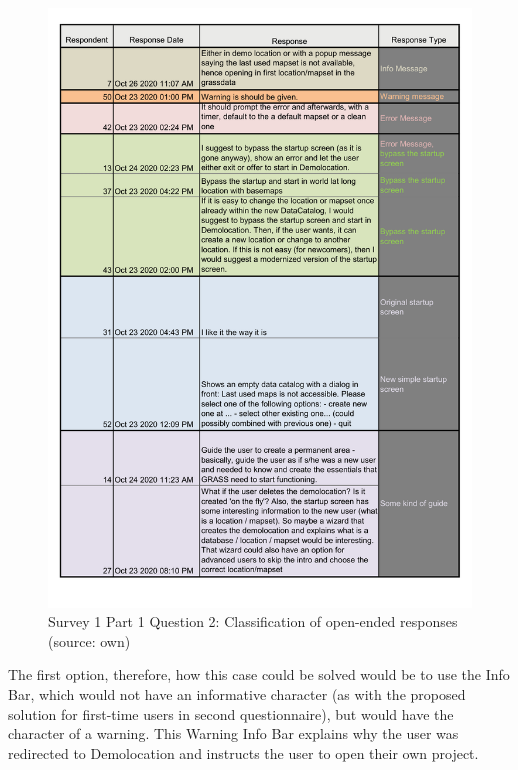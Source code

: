 \documentclass[a4paper,10pt,twoside]{article}
\begin{document}
\vspace{0.3cm}
\begin{figure}[hbt!] 
\begin{center}
\includegraphics[width=15cm]{../surveys/analyzed_data/survey1_part1_question2_other_answers.pdf} 
\caption[Survey 1 Part 1 Question 2: Classification of open-ended responses]{Survey 1 Part 1 Question 2: Classification of open-ended responses (source: own)}
\label{fig:survey1_part1_question2_other_answers}
\end{center}
\end{figure}

\noindent The first option, therefore, how this case could be solved would be to use the Info Bar, which would not have an informative character (as with the proposed solution for first-time users in second questionnaire), but would have the character of a warning. This Warning Info Bar explains why the user was redirected to Demolocation and instructs the user to open their own project.
\end{document}
